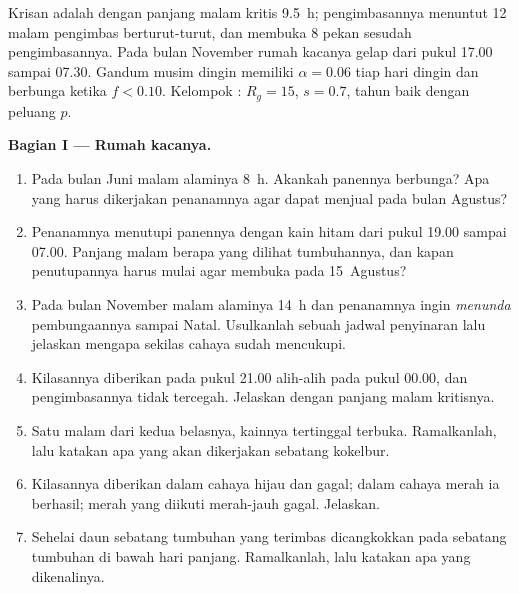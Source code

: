\begin{problem}
\label{pb:b2:plant-flowering:1}
Krisan adalah  dengan panjang malam kritis
\qty{9.5}{h}; pengimbasannya menuntut \num{12} malam pengimbas
berturut-turut, dan  membuka \num{8} pekan sesudah
pengimbasannya. Pada bulan November rumah kacanya gelap dari pukul
17.00 sampai 07.30. Gandum musim dingin memiliki $\alpha = 0.06$ tiap
hari dingin dan berbunga ketika $f < 0.10$. Kelompok :
$R_g = 15$, $s = 0.7$, tahun baik dengan peluang $p$.

\medskip
\noindent\textbf{Bagian I --- Rumah kacanya.}
\begin{enumerate}
  \item Pada bulan Juni malam alaminya \qty{8}{h}. Akankah panennya
        berbunga? Apa yang harus dikerjakan penanamnya agar dapat
        menjual  pada bulan Agustus?
  \item Penanamnya menutupi panennya dengan kain hitam dari pukul
        19.00 sampai 07.00. Panjang malam berapa yang dilihat
        tumbuhannya, dan kapan penutupannya harus mulai agar 
        membuka pada 15~Agustus?
  \item Pada bulan November malam alaminya \qty{14}{h} dan penanamnya
        ingin \emph{menunda} pembungaannya sampai Natal. Usulkanlah
        sebuah jadwal penyinaran lalu jelaskan mengapa sekilas cahaya
        sudah mencukupi.
  \item Kilasannya diberikan pada pukul 21.00 alih-alih pada pukul
        00.00, dan pengimbasannya tidak tercegah. Jelaskan dengan
        panjang malam kritisnya.
  \item Satu malam dari kedua belasnya, kainnya tertinggal terbuka.
        Ramalkanlah, lalu katakan apa yang akan dikerjakan sebatang
        kokelbur.
  \item Kilasannya diberikan dalam cahaya hijau dan gagal; dalam
        cahaya merah ia berhasil; merah yang diikuti merah-jauh gagal.
        Jelaskan.
  \item Sehelai daun sebatang tumbuhan yang terimbas dicangkokkan pada
        sebatang tumbuhan di bawah hari panjang. Ramalkanlah, lalu
        katakan apa yang dikenalinya.
\end{enumerate}


\end{problem}
